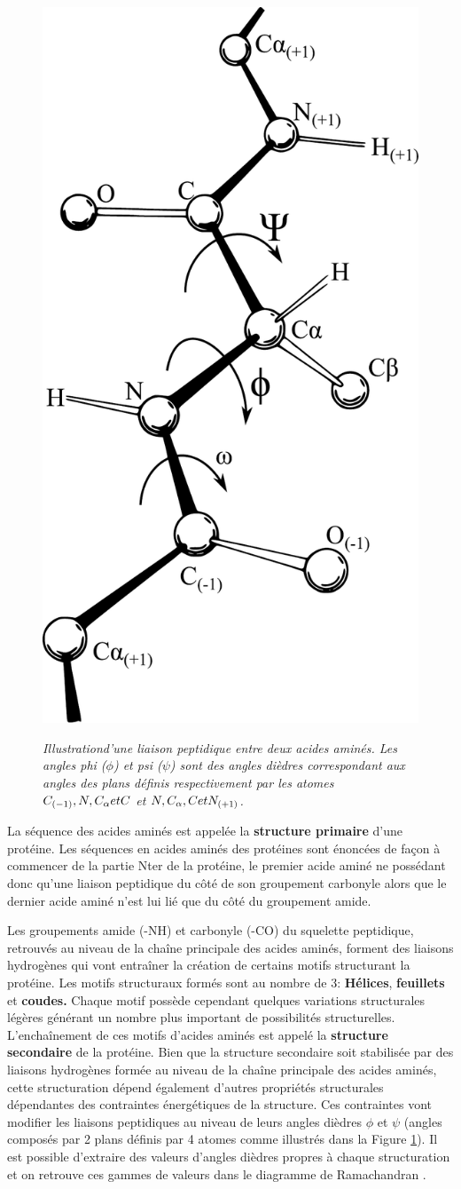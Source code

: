 \begin{figure}
  \centering
  {\includegraphics[width=0.3\linewidth]{./figures/ch1/phi_psi.pdf}}
    \caption{\it Illustration\protect\footnotemark d'une liaison peptidique entre deux acides aminés. Les angles phi ($\phi$) et psi ($\psi$) sont des angles dièdres correspondant aux angles des plans définis respectivement par les atomes $ C_{(-1)}, N, C_\protect\alpha et C$ et $N, C_\protect\alpha, C et N_{(+1)}$.}
    \label{Fig:phi_psi}
  \hspace{0.3cm}
\end{figure}


La séquence des acides aminés est appelée la \textbf{structure primaire} d'une protéine. Les séquences en acides aminés des protéines sont énoncées de façon à commencer de la partie Nter de la protéine, le premier acide aminé ne possédant donc qu'une liaison peptidique du côté de son groupement carbonyle alors que le dernier acide aminé n'est lui lié que du côté du groupement amide.

Les groupements amide (-NH) et carbonyle (-CO) du squelette peptidique, retrouvés au niveau de la chaîne principale des acides aminés, forment des liaisons hydrogènes qui vont entraîner la création de certains motifs structurant la protéine. Les motifs structuraux formés sont au nombre de 3: \textbf{Hélices}, \textbf{feuillets} et \textbf{coudes.} Chaque motif possède cependant quelques variations structurales légères générant un nombre plus important de possibilités structurelles. L’enchaînement de ces motifs d'acides aminés est appelé la \textbf{structure secondaire} de la protéine. Bien que la structure secondaire soit stabilisée par des liaisons hydrogènes formée au niveau de la chaîne principale des acides aminés, cette structuration dépend également d'autres propriétés structurales dépendantes des contraintes énergétiques de la structure. Ces contraintes vont modifier les liaisons peptidiques au niveau de leurs angles dièdres $\phi$ et $\psi$ (angles composés par 2 plans définis par 4 atomes comme illustrés dans la Figure \ref{Fig:phi_psi}). Il est possible d'extraire des valeurs d'angles dièdres propres à chaque structuration et on retrouve ces gammes de valeurs dans le diagramme de Ramachandran \cite{ramachandran1968conformation}.

